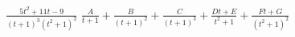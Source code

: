 {$\displaystyle \frac{5t^2+11t-9}{(t+1)^3(t^2+1)^2}$}
{$\displaystyle \frac{A}{t+1} + \frac{B}{(t+1)^2} + \frac{C}{(t+1)^3} + \frac{Dt+E}{t^2+1} + \frac{Ft+G}{(t^2+1)^2}$}
